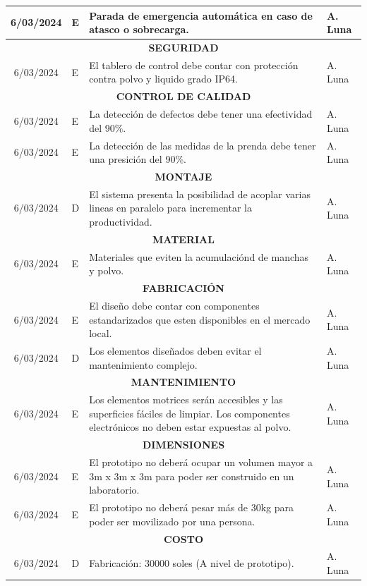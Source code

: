 \begin{longtable}{|c|p{4.5em}|p{22.5em}|p{6em}|}
	\hline
	6/03/2024 & E     & Parada de emergencia automática en caso de atasco o sobrecarga. & A. Luna \bigstrut\\
	\hline
	\multicolumn{4}{|p{37.5em}|}{\textbf{SEGURIDAD}} \bigstrut\\
	\hline
	6/03/2024 & E     & El tablero de control debe contar con protección contra polvo y liquido grado IP64. & A. Luna \bigstrut\\
	\hline
	\multicolumn{4}{|p{37.5em}|}{\textbf{CONTROL DE CALIDAD}} \bigstrut\\
	\hline
	6/03/2024 & E     & La detección de defectos debe tener una efectividad del 90\%. & A. Luna \bigstrut\\
	\hline
	6/03/2024 & E     & La detección de las medidas de la prenda debe tener una presición del 90\%. & A. Luna \bigstrut\\
	\hline
	\multicolumn{4}{|p{37.5em}|}{\textbf{MONTAJE}} \bigstrut\\
	\hline
	6/03/2024 & D     & El sistema presenta la posibilidad de acoplar varias lineas en paralelo para incrementar la productividad. & A. Luna \bigstrut\\
	\hline
	\multicolumn{4}{|p{37.5em}|}{\textbf{MATERIAL}} \bigstrut\\
	\hline
	6/03/2024 & E     & Materiales que eviten la acumulaciónd de manchas y polvo. & A. Luna \bigstrut\\
	\hline
	\multicolumn{4}{|p{37.5em}|}{\textbf{FABRICACIÓN}} \bigstrut\\
	\hline
	6/03/2024 & E     & El diseño debe contar con componentes estandarizados que esten disponibles en el mercado local. & A. Luna \bigstrut\\
	\hline
	6/03/2024 & D     & Los elementos diseñados deben evitar el mantenimiento complejo. & A. Luna \bigstrut\\
	\hline
	\multicolumn{4}{|p{37.5em}|}{\textbf{MANTENIMIENTO}} \bigstrut\\
	\hline
	6/03/2024 & E     & Los elementos motrices serán accesibles y las superficies fáciles de limpiar. Los componentes electrónicos no deben estar expuestas al polvo. & A. Luna \bigstrut\\
	\hline
	\multicolumn{4}{|p{37.5em}|}{\textbf{DIMENSIONES}} \bigstrut\\
	\hline
	6/03/2024 & E     & El prototipo no deberá ocupar un volumen mayor a 3m x 3m x 3m para poder ser construido en un laboratorio. & A. Luna \bigstrut\\
	\hline
	6/03/2024 & E     & El prototipo no deberá pesar más de 30kg para poder ser movilizado por una persona. & A. Luna \bigstrut\\
	\hline
	\multicolumn{4}{|p{37.5em}|}{\textbf{COSTO}} \bigstrut\\
	\hline
	6/03/2024 & D     & Fabricación: 30000 soles (A nivel de prototipo). & A. Luna \bigstrut\\
	\hline
\end{longtable}%


